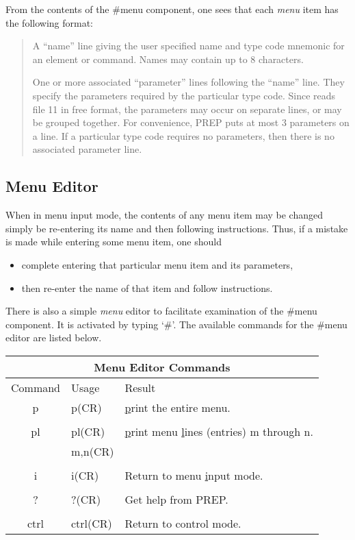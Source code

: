 From the contents of the \#menu component, one sees that each {\em menu}
item has the following format:
\begin{quotation} A ``name'' line giving the user specified name and type
code mnemonic for an element or command. Names may contain up to 8
characters.

One or more associated ``parameter'' lines following the ``name'' line.
They specify the parameters required by the particular type code. Since
\Mary reads file 11 in free format, the parameters may occur on separate
lines, or may be grouped together. For convenience, PREP puts at most 3
parameters on a line. If a particular type code requires no parameters,
then there is no associated parameter line.
\end{quotation}
\subsection{Menu Editor} When in menu input mode, the contents of any menu
item may be changed simply be re-entering its name and then following
instructions. Thus, if a mistake is made while entering some menu item, one
should
\begin{itemize}
\item complete entering that particular menu item and its parameters,
\item then re-enter the name of that item and follow instructions.
\end{itemize}

There is also a simple {\em menu} editor to facilitate examination of the
\#menu component. It is activated by typing `\#'. The available commands
for the \#menu editor are listed below.
\begin{table}[hbp]
\begin{center}
\begin{tabular}{|c|l|l|} \hline
\multicolumn{3}{|c|}{Menu Editor Commands}\\ \hline Command & Usage &
Result\\ \hline p & p(CR) & {\underline p}rint the entire menu.\\ & &\\ pl
& pl(CR) & {\underline p}rint menu {\underline l}ines (entries) m through
n.\\ & m,n(CR) &\\ & &\\ i & i(CR) & Return to menu {\underline i}nput
mode.\\ & &\\ ? & ?(CR) & Get help from PREP.\\ & &\\ ctrl & ctrl(CR) &
Return to control mode.\\ \hline
\end{tabular}
\end{center}
\end{table}

